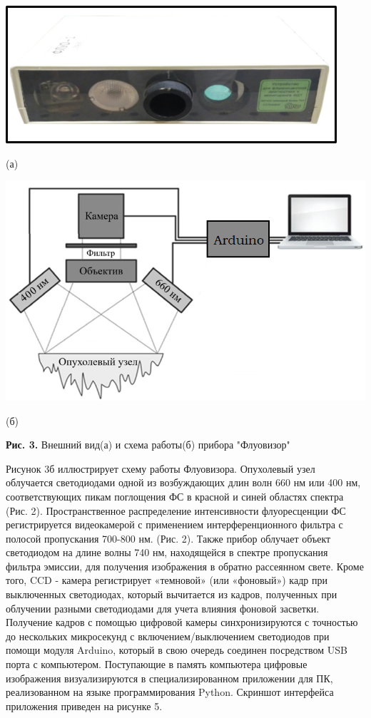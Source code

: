 \documentclass[a4paper,14pt]{extarticle}
\begin{document}
\begin{center}
    \includegraphics[scale = 0.6]{Fluo.png}
    
    (а)
    
\end{center}
\begin{center}
    \includegraphics[scale = 0.7]{Fluo_shem.png}
    
    (б)
    
    \textbf{Рис. 3.} Внешний вид(а) и схема работы(б) прибора "Флуовизор"
\end{center}

Рисунок 3б иллюстрирует схему работы Флуовизора.
Опухолевый узел облучается светодиодами одной из возбуждающих длин волн 660 нм или 400 нм, соответствующих пикам поглощения ФС в красной и синей областях спектра (Рис. 2). Пространственное распределение интенсивности флуоресценции ФС регистрируется видеокамерой с применением интерференционного фильтра с полосой пропускания 700-800 нм. (Рис. 2). Также прибор облучает объект светодиодом на длине волны 740 нм, находящейся в спектре пропускания фильтра эмиссии, для получения изображения в обратно рассеянном свете. Кроме того,  CCD - камера регистрирует «темновой» (или «фоновый») кадр при выключенных светодиодах, который вычитается из кадров, полученных при облучении разными светодиодами для учета влияния фоновой засветки. Получение кадров с помощью цифровой камеры синхронизируются с точностью до нескольких микросекунд с включением/выключением светодиодов при помощи модуля Arduino, который в свою очередь соединен посредством USB порта с компьютером. Поступающие в память компьютера цифровые изображения визуализируются в специализированном приложении для ПК, реализованном на языке программирования Python. Скриншот интерфейса приложения приведен на рисунке 5.
\end{document}
